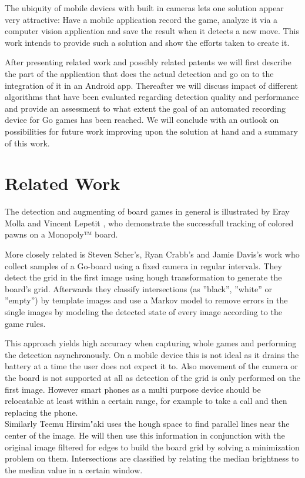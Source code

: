 	The ubiquity of mobile devices with built in cameras lets one solution appear very attractive: Have a mobile application record the game, analyze it via a computer vision application and save the result when it detects a new move. This	work intends to provide such a solution and show the efforts taken to create it.

	After presenting related work and possibly related patents we will first describe the part of the application that does the actual detection and go on to the integration of it in an Android app. Thereafter we will discuss impact of different algorithms that have been evaluated regarding detection quality and performance and provide an assessment to what extent the goal of an automated recording device for Go games has been reached. We will conclude with an outlook on possibilities for future work improving upon the solution at hand and a summary of this work.


	\section{Related Work}
	The detection and augmenting of board games in general is illustrated by Eray Molla and Vincent Lepetit \cite{molla2010augmented}, who demonstrate the successfull tracking of colored pawns on a Monopoly™ board.

	More closely related is  Steven Scher's, Ryan Crabb's and Jamie Davis's work \cite{scher2008making} who collect samples of a Go-board using a fixed camera in regular intervals. They detect the grid in the first image using hough transformation to generate the board's grid. Afterwards they classify intersections (as ''black'', ''white'' or ''empty'') by template images and use a Markov model to remove errors in the single images by modeling the detected state of every image according to the game rules.

	This approach yields high accuracy when capturing whole games and performing the detection asynchronously. On a mobile device this is not ideal as it drains the battery at a time the user does not expect it to. Also movement of the camera or the board is not supported at all as detection of the grid is only performed on the first image. However smart phones as a multi purpose device should be relocatable at least within a certain range, for example to take a call and then replacing the phone.
	\\

	Similarly Teemu Hirsim"aki \cite{hirsimaki2005extracting} uses the hough space to find parallel lines near the center of the image. He will then use this information in conjunction with the original image filtered for edges to build the board grid by solving a minimization problem on them. Intersections are classified by relating the median brightness to the median value in a certain window.

